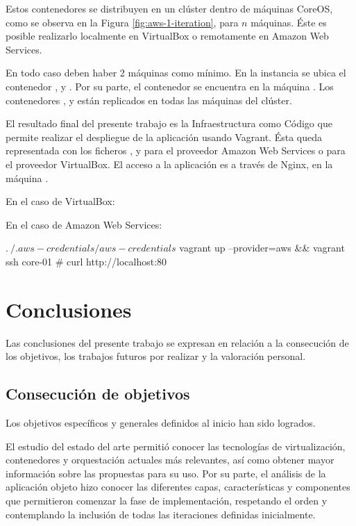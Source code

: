 Estos contenedores se distribuyen en un clúster dentro de máquinas CoreOS, como se observa en la Figura \ref{fig:aws-1-iteration}, para $n$ máquinas. Éste es posible realizarlo localmente en VirtualBox o remotamente en Amazon Web Services. 

En todo caso deben haber 2 máquinas como mínimo. En la instancia  se ubica el contenedor ,  y . Por su parte, el contenedor  se encuentra en la máquina . Los contenedores ,  y  están replicados en todas las máquinas del clúster. 

El resultado final del presente trabajo es la Infraestructura como Código que permite realizar el despliegue de la aplicación usando Vagrant. Ésta queda representada con los ficheros ,  y  para el proveedor Amazon Web Services o  para el proveedor VirtualBox. El acceso a la aplicación es a través de Nginx, en la máquina .

En el caso de VirtualBox:


En el caso de Amazon Web Services:

\begin{code}
$ . ~/.aws-credentials/aws-credentials
$ vagrant up --provider=aws && vagrant ssh core-01
# curl http://localhost:80
\end{code}

\section{Conclusiones}

Las conclusiones del presente trabajo se expresan en relación a la consecución de los objetivos, los trabajos futuros por realizar y la valoración personal.

\subsection{Consecución de objetivos}

Los objetivos específicos y generales definidos al inicio han sido logrados.

El estudio del estado del arte permitió conocer las tecnologías de virtualización, contenedores y orquestación actuales más relevantes, así como obtener mayor información sobre las propuestas para su uso. Por su parte, el análisis de la aplicación objeto hizo conocer las diferentes capas, características y componentes que permitieron comenzar la fase de implementación, respetando el orden y contemplando la inclusión de todas las iteraciones definidas inicialmente. 

